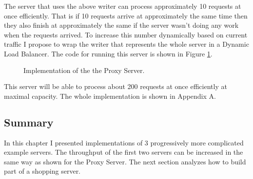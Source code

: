 \newpage
The server that uses the above writer can process approximately 10 requests
at once efficiently. That is if 10 requests arrive at approximately the same
time then they also finish at approximately the same if the server wasn't
doing any work when the requests arrived.
To increase this number dynamically based on current traffic I propose
to wrap the writer that represents the whole server in a Dynamic Load
Balancer. The code for running this server is shown in Figure 
\ref{fig:ProxyServerImpl}.
\begin{figure}[h]
 
\caption[scale=1.0]{Implementation of the the Proxy Server.}
\label{fig:ProxyServerImpl}
\end{figure}

This server will be able to process about 200 requests at once efficiently
at maximal capacity. The whole implementation is shown in Appendix A.

\subsection{Summary}
In this chapter I presented implementations of 3 progressively more 
complicated example servers. The throughput of the first two servers
can be increased in the same way as shown for the Proxy Server. The 
next section analyzes how to build part of a shopping server.


